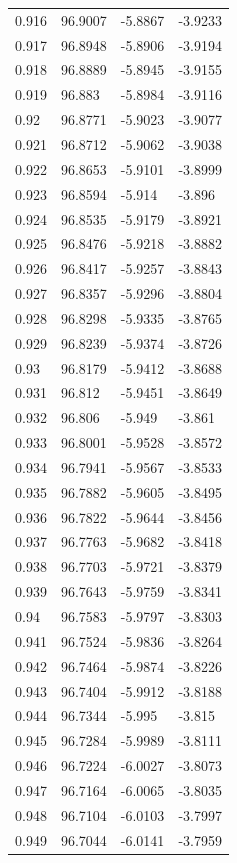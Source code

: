 \begin{tabular}{llll}
0.916 & 96.9007 & -5.8867 & -3.9233 \\
0.917 & 96.8948 & -5.8906 & -3.9194 \\
0.918 & 96.8889 & -5.8945 & -3.9155 \\
0.919 & 96.883 & -5.8984 & -3.9116 \\
0.92 & 96.8771 & -5.9023 & -3.9077 \\
0.921 & 96.8712 & -5.9062 & -3.9038 \\
0.922 & 96.8653 & -5.9101 & -3.8999 \\
0.923 & 96.8594 & -5.914 & -3.896 \\
0.924 & 96.8535 & -5.9179 & -3.8921 \\
0.925 & 96.8476 & -5.9218 & -3.8882 \\
0.926 & 96.8417 & -5.9257 & -3.8843 \\
0.927 & 96.8357 & -5.9296 & -3.8804 \\
0.928 & 96.8298 & -5.9335 & -3.8765 \\
0.929 & 96.8239 & -5.9374 & -3.8726 \\
0.93 & 96.8179 & -5.9412 & -3.8688 \\
0.931 & 96.812 & -5.9451 & -3.8649 \\
0.932 & 96.806 & -5.949 & -3.861 \\
0.933 & 96.8001 & -5.9528 & -3.8572 \\
0.934 & 96.7941 & -5.9567 & -3.8533 \\
0.935 & 96.7882 & -5.9605 & -3.8495 \\
0.936 & 96.7822 & -5.9644 & -3.8456 \\
0.937 & 96.7763 & -5.9682 & -3.8418 \\
0.938 & 96.7703 & -5.9721 & -3.8379 \\
0.939 & 96.7643 & -5.9759 & -3.8341 \\
0.94 & 96.7583 & -5.9797 & -3.8303 \\
0.941 & 96.7524 & -5.9836 & -3.8264 \\
0.942 & 96.7464 & -5.9874 & -3.8226 \\
0.943 & 96.7404 & -5.9912 & -3.8188 \\
0.944 & 96.7344 & -5.995 & -3.815 \\
0.945 & 96.7284 & -5.9989 & -3.8111 \\
0.946 & 96.7224 & -6.0027 & -3.8073 \\
0.947 & 96.7164 & -6.0065 & -3.8035 \\
0.948 & 96.7104 & -6.0103 & -3.7997 \\
0.949 & 96.7044 & -6.0141 & -3.7959 \\

\end{tabular}
